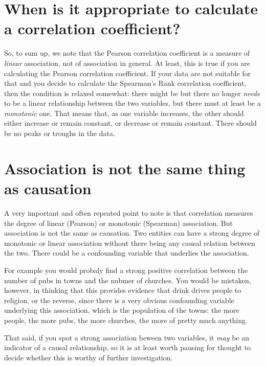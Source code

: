 \documentclass[
  letterpaper,
  DIV=11,
  numbers=noendperiod]{scrreprt}
\begin{document}
\section{When is it appropriate to calculate a correlation
coefficient?}\label{when-is-it-appropriate-to-calculate-a-correlation-coefficient}

So, to sum up, we note that the Pearson correlation coefficient is a
measure of \emph{linear} association, not of association in general. At
least, this is true if you are calculating the Pearson correlation
coefficient. If your data are not suitable for that and you decide to
calculate the Spearman's Rank correlation coefficient, then the
condition is relaxed somewhat: there might be but there no longer
\emph{needs} to be a linear relationship between the two variables, but
there must at least be a \emph{monotonic} one. That means that, as one
variable increases, the other should either increase or remain constant,
or decrease or remain constant. There should be no peaks or troughs in
the data.

\section{Association is not the same thing as
causation}\label{association-is-not-the-same-thing-as-causation}

A very important and often repeated point to note is that correlation
measures the degree of linear (Pearson) or monotonic (Spearman)
association. But association is not the same as causation. Two entities
can have a strong degree of monotonic or linear association without
there being any causal relation between the two. There could be a
confounding variable that underlies the association.

For example you would probaly find a strong positive correlation between
the number of pubs in towns and the nubmer of churches. You would be
mistaken, however, in thinking that this provides evidence that drink
drives people to religion, or the reverse, since there is a very obvious
confounding variable underlying this association, which is the
population of the towns: the more people, the more pubs, the more
churches, the more of pretty much anything.

That said, if you spot a strong association beween two variables, it
\emph{may} be an indicator of a causal relationship, so it is at least
worth pausing for thought to decide whether this is worthy of further
investigation.
\end{document}
